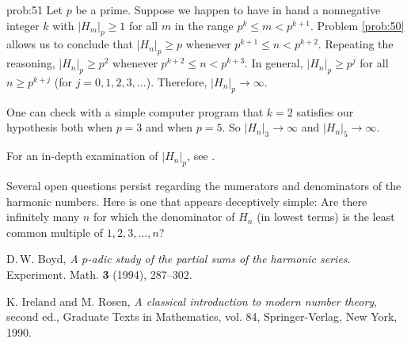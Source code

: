 \begin{sol}{prob:51} Let $p$ be a prime. Suppose we happen to have in hand a nonnegative integer $k$ with $|H_m|_{p} \ge 1$ for all $m$ in the range $p^k \le m < p^{k+1}$. Problem \ref{prob:50} allows us to conclude that $|H_n|_{p} \ge p$ whenever $p^{k+1} \le n < p^{k+2}$. Repeating the reasoning, $|H_n|_{p} \ge p^2$ whenever $p^{k+2} \le n < p^{k+3}$. In general, $|H_n|_p \ge p^{j}$ for all $n\ge p^{k+j}$ (for $j=0,1,2,3,\dots$). Therefore, $|H_n|_{p}\to\infty$. 

One can check with a simple computer program that $k=2$ satisfies our hypothesis both when $p=3$ and when $p=5$. So $|H_n|_{3}\to\infty$ and $|H_n|_{5}\to\infty$. 

\begin{rmk} For an in-depth examination of $|H_n|_{p}$, see \cite{boyd}. 

Several open questions persist regarding the numerators and denominators of the harmonic numbers. Here is one that appears deceptively simple: Are there infinitely many $n$ for which the denominator of $H_n$ (in lowest terms) is the least common multiple of $1,2,3,\dots, n$?
\end{rmk}

\end{sol}

\let\oldaddcontentsline\addcontentsline
\renewcommand{\addcontentsline}[3]{}
\begin{thebibliography}{11}
          D.\,W. Boyd,
\emph{A $p$-adic study of the partial sums of the harmonic series}. Experiment. Math. \textbf{3} (1994), 287--302.

 K. Ireland and M. Rosen, \emph{A classical introduction to modern number theory}, second ed., Graduate Texts in Mathematics, vol. 84, Springer-Verlag, New York, 1990.
    \end{thebibliography}
\let\addcontentsline\oldaddcontentsline

